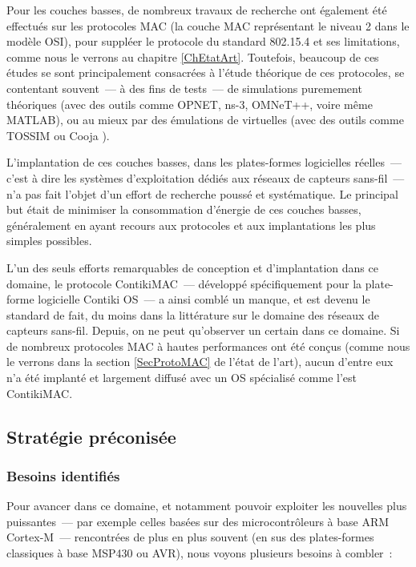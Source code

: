Pour les couches basses, de nombreux travaux de recherche ont également
été effectués sur les protocoles MAC (la couche MAC représentant le
niveau 2 dans le modèle OSI), pour suppléer le protocole du
standard 802.15.4 et ses limitations, comme nous le verrons au
chapitre \vref{ChEtatArt}. Toutefois, beaucoup de ces études se
sont principalement consacrées à l'étude théorique de ces protocoles,
se contentant souvent~--- à des fins de tests~--- de simulations
puremement théoriques (avec des outils comme OPNET, ns-3, OMNeT++, voire
même MATLAB), ou au mieux par des émulations de  virtuelles
(avec des outils comme TOSSIM \cite{TOSSIM} ou Cooja \cite{Cooja}).

L'implantation de ces couches basses, dans les plates-formes logicielles
réelles~--- c'est à dire les systèmes d'exploitation dédiés aux réseaux de
capteurs sans-fil~--- n'a pas fait l'objet d'un effort de recherche poussé
et systématique. Le principal but était de minimiser la consommation
d'énergie de ces couches basses, généralement en ayant recours aux
protocoles et aux implantations les plus simples possibles.

L'un des seuls efforts remarquables de conception et d'implantation
dans ce domaine, le protocole ContikiMAC~--- développé spécifiquement
pour la plate-forme logicielle Contiki OS~--- a ainsi comblé un manque,
et est devenu le standard de fait, du moins dans la littérature sur le
domaine des réseaux de capteurs sans-fil. Depuis, on ne peut qu'observer
un certain  dans ce domaine. Si de nombreux protocoles
MAC à hautes performances ont été conçus (comme nous le verrons dans
la section \vref{SecProtoMAC} de l'état de l'art), aucun d'entre
eux n'a été implanté et largement diffusé avec un OS spécialisé
comme l'est ContikiMAC.


\subsection{Stratégie préconisée}
\label{SubsecStrategieThese}

\subsubsection{Besoins identifiés}
\label{ParBesoins}

Pour avancer dans ce domaine, et notamment pouvoir exploiter les
nouvelles  plus puissantes~--- par exemple celles basées
sur des microcontrôleurs à base ARM Cortex-M~--- rencontrées de plus
en plus souvent (en sus des plates-formes classiques à base MSP430
ou AVR), nous voyons plusieurs besoins à combler~:


